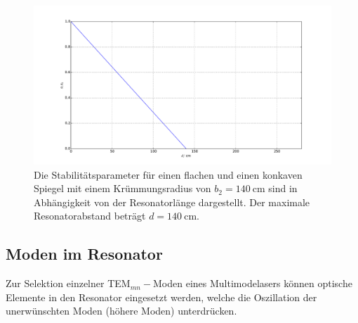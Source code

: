 \begin{figure}
    \centering
    \includegraphics[width=15cm]{plots/stability2.pdf}
    \caption{Die Stabilitätsparameter für einen flachen und einen konkaven Spiegel mit einem Krümmungsradius von $b_2 = \SI{140}{\centi\meter}$ sind in Abhängigkeit von der Resonatorlänge dargestellt. Der maximale Resonatorabstand beträgt $d = \SI{140}{\centi\meter}$.}
    \label{fig:stability2}
\end{figure}

\subsection{Moden im Resonator}
%

Zur Selektion einzelner TEM$_{mn}-$Moden eines Multimodelasers können optische Elemente in den Resonator eingesetzt werden, welche die Oszillation der unerwünschten Moden (höhere Moden) unterdrücken.

